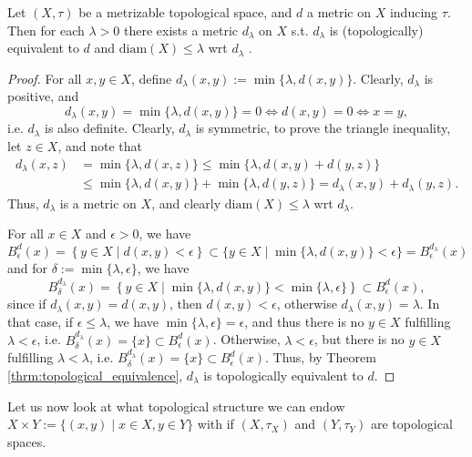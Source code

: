 \begin{theorem}\label{thrm:equivalent_metric_finite_diameter}
	Let $(X, \tau)$ be a metrizable topological space, and $d$ a metric on $X$ inducing $\tau$. Then for each $\lambda > 0$ there exists a metric $d_{\lambda}$ on $X$ s.t. $d_{\lambda}$ is (topologically) equivalent to $d$ and $\text{diam}(X) \leq \lambda$ wrt $d_{\lambda}$ \cite{topology-singh}.
\end{theorem}

\begin{proof}
	For all $x, y\in X$, define $d_{\lambda}(x, y) := \min\{\lambda, d(x, y)\}$. Clearly, $d_{\lambda}$ is positive, and $$d_{\lambda}(x, y) = \min\{\lambda, d(x, y)\} = 0\Leftrightarrow d(x, y) = 0\Leftrightarrow x = y,$$ i.e. $d_{\lambda}$ is also definite.
	Clearly, $d_{\lambda}$ is symmetric, to prove the triangle inequality, let $z\in X$, and note that
	\begin{align*}
		d_{\lambda}(x, z) &= \min\{\lambda, d(x, z)\} \leq \min\{ \lambda, d(x, y) + d(y, z) \} \\ &\leq \min\{\lambda, d(x, y)\} + \min\{\lambda, d(y, z)\} = d_{\lambda}(x, y) + d_{\lambda}(y, z).
	\end{align*}
	Thus, $d_{\lambda}$ is a metric on $X$, and clearly $\text{diam}(X)\leq\lambda$ wrt $d_{\lambda}$. 
	
	For all $x\in X$ and $\epsilon > 0$, we have 
	$$B^{d}_{\epsilon}(x)  = \left\{y\in X\mid d(x, y) < \epsilon\right\} \subset \{y\in X\mid \min\{\lambda, d(x, y)\} < \epsilon\} = B_{\epsilon}^{d_{\lambda}}(x)$$
	and for $\delta := \min\{\lambda, \epsilon\}$, we have
	$$B^{d_{\lambda}}_{\delta}(x) = \left\{y\in X\mid \min\{\lambda, d(x, y)\} < \min\{\lambda, \epsilon\}\right\} \subset B^{d}_{\epsilon}(x),$$
	since if $d_{\lambda}(x, y) = d(x, y)$, then $d(x, y) < \epsilon$, otherwise $d_{\lambda}(x, y) = \lambda$. In that case, if $\epsilon\leq \lambda$, we have $\min\{\lambda, \epsilon\} = \epsilon$, and thus there is no $y\in X$ fulfilling $\lambda < \epsilon$, i.e. $B_{\delta}^{d_{\lambda}}(x) = \{x\}\subset B_{\epsilon}^{d}(x)$. Otherwise, $\lambda < \epsilon$, but there is no $y\in X$ fulfilling $\lambda < \lambda$, i.e. $B_{\delta}^{d_{\lambda}}(x) = \{x\}\subset B_{\epsilon}^{d}(x)$. Thus, by Theorem \ref{thrm:topological_equivalence}, $d_{\lambda}$ is topologically equivalent to $d$.
\end{proof}

Let us now look at what topological structure we can endow $X\times Y := \{ (x, y) \mid x\in X, y\in Y \}$ with if $(X, \tau_X)$ and $(Y, \tau_Y)$ are topological spaces.

